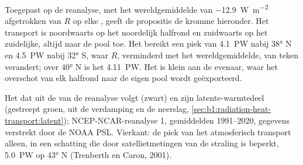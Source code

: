 Toegepast op de reanalyse, met het wereldgemiddelde van \qty{-12.9}{W.m^{-2}} afgetrokken van $R$ op elke , geeft de propositie de kromme hieronder. Het transport is noordwaarts op het noordelijk halfrond en zuidwaarts op het zuidelijke, altijd naar de pool toe. Het bereikt een piek van \qty{4.1}{PW} nabij \ang{38} N en \qty{4.5}{PW} nabij \ang{32} S, waar $R$, verminderd met het wereldgemiddelde, van teken verandert; over \ang{40} N is het \qty{4.11}{PW}. Het is klein aan de evenaar, waar het overschot van elk halfrond naar de eigen pool wordt geëxporteerd.

\begin{omfigure}

{\small Het  dat uit de  van de reanalyse volgt (zwart) en zijn latente-warmtedeel (gestreept groen, uit de verdamping en de neerslag, \cref{sec:b1:radiation-heat-transport:latent}); NCEP-NCAR-reanalyse 1, gemiddelden 1991--2020, gegevens verstrekt door de NOAA PSL. Vierkant: de piek van het atmosferisch transport alleen, in een schatting die door satellietmetingen van de straling is beperkt, \qty{5.0}{PW} op \ang{43} N (Trenberth en Caron, 2001).}
\label{fig:b1:radiation-heat-transport:transport}
\end{omfigure}


